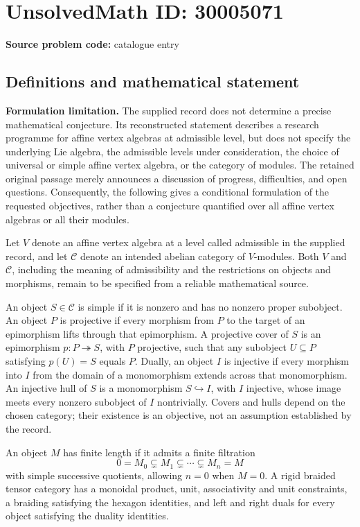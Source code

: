 \documentclass[11pt]{article}
\begin{document}
\section*{UnsolvedMath ID: 30005071}
\textbf{Source problem code:} catalogue entry
\subsection{Definitions and mathematical statement}
\textbf{Formulation limitation.} The supplied record does not determine a precise mathematical conjecture. Its reconstructed statement describes a research programme for affine vertex algebras at admissible level, but does not specify the underlying Lie algebra, the admissible levels under consideration, the choice of universal or simple affine vertex algebra, or the category of modules. The retained original passage merely announces a discussion of progress, difficulties, and open questions. Consequently, the following gives a conditional formulation of the requested objectives, rather than a conjecture quantified over all affine vertex algebras or all their modules.

Let \(V\) denote an affine vertex algebra at a level called admissible in the supplied record, and let \(\mathcal C\) denote an intended abelian category of \(V\)-modules. Both \(V\) and \(\mathcal C\), including the meaning of admissibility and the restrictions on objects and morphisms, remain to be specified from a reliable mathematical source.

An object \(S\in\mathcal C\) is simple if it is nonzero and has no nonzero proper subobject. An object \(P\) is projective if every morphism from \(P\) to the target of an epimorphism lifts through that epimorphism. A projective cover of \(S\) is an epimorphism \(p:P\twoheadrightarrow S\), with \(P\) projective, such that any subobject \(U\subseteq P\) satisfying \(p(U)=S\) equals \(P\). Dually, an object \(I\) is injective if every morphism into \(I\) from the domain of a monomorphism extends across that monomorphism. An injective hull of \(S\) is a monomorphism \(S\hookrightarrow I\), with \(I\) injective, whose image meets every nonzero subobject of \(I\) nontrivially. Covers and hulls depend on the chosen category; their existence is an objective, not an assumption established by the record.

An object \(M\) has finite length if it admits a finite filtration
\[
0=M_0\subsetneq M_1\subsetneq\cdots\subsetneq M_n=M
\]
with simple successive quotients, allowing \(n=0\) when \(M=0\). A rigid braided tensor category has a monoidal product, unit, associativity and unit constraints, a braiding satisfying the hexagon identities, and left and right duals for every object satisfying the duality identities.
\end{document}
